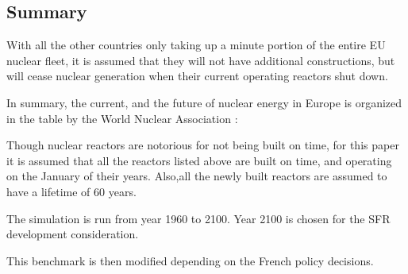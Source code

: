 \subsection{Summary}
With all the other countries only taking up a minute portion of the entire
EU nuclear fleet, it is assumed that they will not have additional constructions,
but will cease nuclear generation when their current operating reactors shut down.

In summary, the current, and the future of nuclear energy in Europe is organized
in the table by the World Nuclear Association \cite{world_nuclear_association_nuclear_2017}:

\begin{table}[h]
	\centering
	\caption {Power Reactors under construction and planned \cite{world_nuclear_association_nuclear_2017}}
\end{table}

Though nuclear reactors are notorious for not being built on time,
for this paper it is assumed that all the reactors listed above are built
on time, and operating on the January of their years. Also,all the newly
built reactors are assumed to have a lifetime of 60 years.

The simulation is run from year 1960 to 2100. Year 2100 is chosen for the 
SFR development consideration.

This benchmark is then modified depending on the French policy decisions.